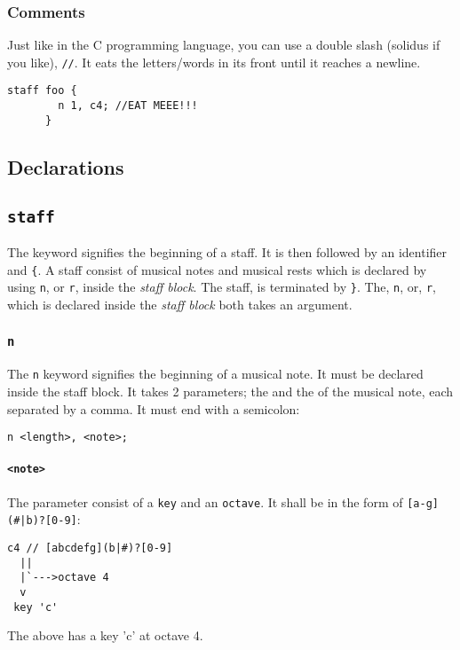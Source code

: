 \subsubsection{Comments}
\np Just like in the C programming language, you can use a double slash (solidus if you like), \verb+//+.
It eats the letters/words in its front until it reaches a newline.
\begin{Verbatim}[frame=single]
      staff foo {
        n 1, c4; //EAT MEEE!!!
      }
\end{Verbatim}

\subsection{Declarations}

\subsection{\texttt{staff}}
\np The  keyword signifies the beginning of a staff. It is then followed by an identifier and \verb+{+. A staff consist of
musical notes and musical rests which is declared by using \verb+n+, or \verb+r+, inside the \textit{staff block}.
The staff, is terminated by \verb+}+. The, \verb+n+, or, \verb+r+, which is declared inside the \textit{staff block} both takes an argument.

\subsubsection{\texttt{n}}

\np The \verb+n+ keyword signifies the beginning of a musical note. It must be declared
inside the staff block.
It takes 2 parameters; the  and the  of the
musical note, each separated by a comma. It must end with a semicolon: 

\begin{Verbatim}[frame=single]
      n <length>, <note>;
\end{Verbatim}

\paragraph{\texttt{<note>}} The parameter  consist of a \verb+key+ and an \verb+octave+. It shall be in the form of \verb+[a-g](#|b)?[0-9]+:

\begin{Verbatim}[frame=single]
  c4 // [abcdefg](b|#)?[0-9]
  ||
  |`--->octave 4
  v
 key 'c'
\end{Verbatim}
The above has a key 'c' at octave 4.

